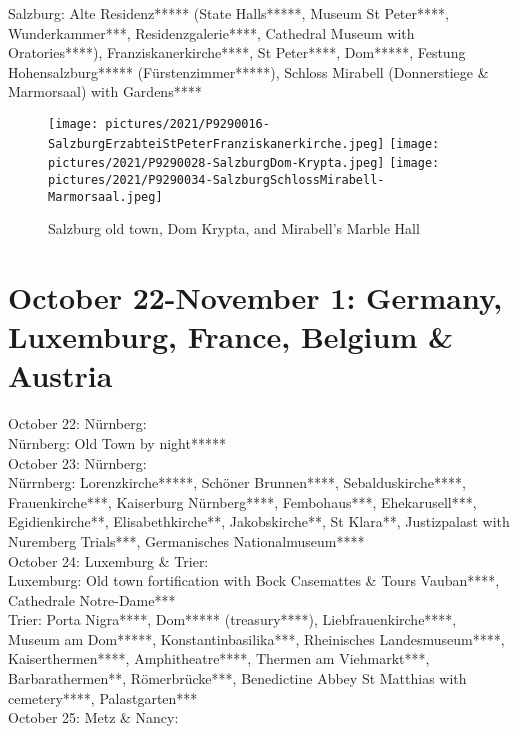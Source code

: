 {Salzburg: Alte Residenz***** (State Halls*****, Museum St Peter****, Wunderkammer***, Residenzgalerie****, Cathedral Museum with Oratories****), Franziskanerkirche****, St Peter****, Dom*****, Festung Hohensalzburg***** (F\"urstenzimmer*****), Schloss Mirabell (Donnerstiege \& Marmorsaal) with Gardens****

    \begin{figure}[htbp!]
  \texttt{[image: pictures/2021/P9290016-SalzburgErzabteiStPeterFranziskanerkirche.jpeg]}
    \texttt{[image: pictures/2021/P9290028-SalzburgDom-Krypta.jpeg]}
      \texttt{[image: pictures/2021/P9290034-SalzburgSchlossMirabell-Marmorsaal.jpeg]}
  \caption{Salzburg old town, Dom Krypta, and Mirabell's Marble Hall}
  \label{fig:SalzburgII}
\end{figure}

\section{October 22-November 1: Germany, Luxemburg, France, Belgium \& Austria}
\label{2021EuropeTripFrance}

October 22: N\"urnberg:\\

N\"urnberg: Old Town by night*****\\

October 23: N\"urnberg:\\

N\"urrnberg: Lorenzkirche*****, Sch\"oner Brunnen****, Sebalduskirche****, Frauenkirche***, Kaiserburg N\"urnberg****, Fembohaus***, Ehekarusell***, Egidienkirche**, Elisabethkirche**, Jakobskirche**, St Klara**, Justizpalast with Nuremberg Trials***, Germanisches Nationalmuseum****\\

October 24: Luxemburg \& Trier:\\

Luxemburg: Old town fortification with Bock Casemattes \& Tours Vauban****, Cathedrale Notre-Dame***\\
Trier: Porta Nigra****, Dom***** (treasury****), Liebfrauenkirche****, Museum am Dom*****, Konstantinbasilika***, Rheinisches Landesmuseum****, Kaiserthermen****, Amphitheatre****, Thermen am Viehmarkt***, Barbarathermen**, R\"omerbr\"ucke***, Benedictine Abbey St Matthias with cemetery****, Palastgarten***\\

October 25: Metz \& Nancy:\\

}

